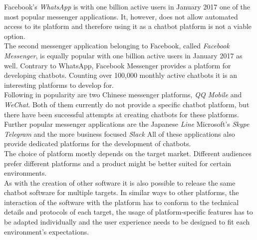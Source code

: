 Facebook's \emph{WhatsApp} is with one billion active users in January 2017\cite{fbpopular} one of the most popular messenger applications. It, however, does not allow automated access to its platform and therefore using it as a chatbot platform is not a viable option.
\\

The second messenger application belonging to Facebook, called \emph{Facebook Messenger}, is equally popular with one billion active users in January 2017\cite{fbpopular} as well. Contrary to WhatsApp, Facebook Messenger provides a platform for developing chatbots. Counting over 100,000 monthly active chatbots\cite{messenger} it is an interesting platforms to develop for.
\\

Following in popularity\cite{appusage} are two Chinese messenger platforms, \emph{QQ Mobile} and \emph{WeChat}. Both of them currently do not provide a specific chatbot platform, but there have been successful attempts at creating chatbots for these platforms\cite{wechatbot}.
\\

Further popular messenger applications are the Japanese \emph{Line} Microsoft's \emph{Skype} \emph{Telegram} and the more business focused \emph{Slack} All of these applications also provide dedicated platforms for the development of chatbots.
\\

The choice of platform mostly depends on the target market. Different audiences prefer different platforms and a product might be better suited for certain environments.
\\
As with the creation of other software it is also possible to release the same chatbot software for multiple targets. In similar ways to other platforms, the interaction of the software with the platform has to conform to the technical details and protocols of each target, the usage of platform-specific features has to be adapted individually and the user experience needs to be designed to fit each environment's expectations.
